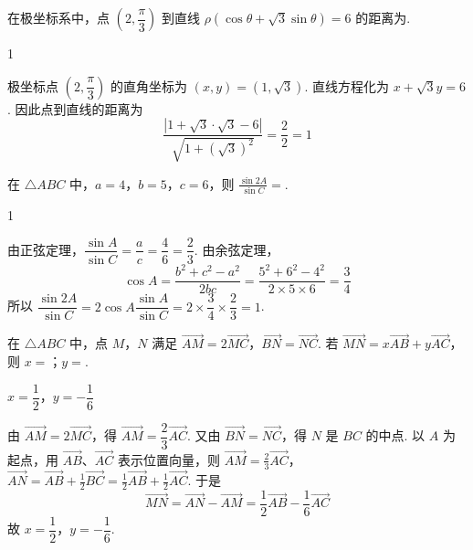 \begin{problem}
在极坐标系中，点 \(\left(2,\dfrac{\pi}{3}\right)\) 到直线 \(\rho(\cos\theta+\sqrt{3}\sin\theta)=6\) 的距离为\fillinblank{}.

\begin{answer}
1
\end{answer}

\begin{solution}
极坐标点 \(\left(2,\dfrac{\pi}{3}\right)\) 的直角坐标为 \((x,y)=(1,\sqrt3)\). 直线方程化为 \(x+\sqrt3y=6\). 因此点到直线的距离为
\[
\frac{|1+\sqrt3\cdot\sqrt3-6|}{\sqrt{1+(\sqrt3)^2}}=\frac{2}{2}=1
\]
\end{solution}
\end{problem}

\begin{problem}
在 \(\triangle ABC\) 中，\(a = 4\)，\(b = 5\)，\(c = 6\)，则 \(\frac{\sin 2A}{\sin C} = \)\fillinblank{}.

\begin{answer}
1
\end{answer}

\begin{solution}
由正弦定理，\(\dfrac{\sin A}{\sin C}=\dfrac{a}{c}=\dfrac{4}{6}=\dfrac{2}{3}\). 由余弦定理，
\[
\cos A=\frac{b^2+c^2-a^2}{2bc}=\frac{5^2+6^2-4^2}{2\times5\times6}=\frac{3}{4}
\]
所以 \(\dfrac{\sin2A}{\sin C}=2\cos A\dfrac{\sin A}{\sin C}=2\times\dfrac34\times\dfrac23=1\).
\end{solution}
\end{problem}

\begin{problem}
在 \(\triangle ABC\) 中，点 \(M\)，\(N\) 满足 \(\overrightarrow{AM} = 2\overrightarrow{MC}\)，\(\overrightarrow{BN} = \overrightarrow{NC}\). 若 \(\overrightarrow{MN} = x\overrightarrow{AB} + y\overrightarrow{AC}\)，则 \(x =\)\fillinblank{}；\(y =\)\fillinblank{}.

\begin{answer}
\(x=\dfrac{1}{2}\)，\(y=-\dfrac{1}{6}\)
\end{answer}

\begin{solution}
由 \(\overrightarrow{AM}=2\overrightarrow{MC}\)，得 \(\overrightarrow{AM}=\dfrac{2}{3}\overrightarrow{AC}\). 又由 \(\overrightarrow{BN}=\overrightarrow{NC}\)，得 \(N\) 是 \(BC\) 的中点. 以 \(A\) 为起点，用 \(\overrightarrow{AB}\)、\(\overrightarrow{AC}\) 表示位置向量，则
\(\overrightarrow{AM}=\frac23\overrightarrow{AC}\)，\(\overrightarrow{AN}=\overrightarrow{AB}+\frac12\overrightarrow{BC} =\frac12\overrightarrow{AB}+\frac12\overrightarrow{AC}\).
于是
\[
\overrightarrow{MN}=\overrightarrow{AN}-\overrightarrow{AM}
=\frac12\overrightarrow{AB}-\frac16\overrightarrow{AC}
\]
故 \(x=\dfrac12\)，\(y=-\dfrac16\).
\end{solution}
\end{problem}


